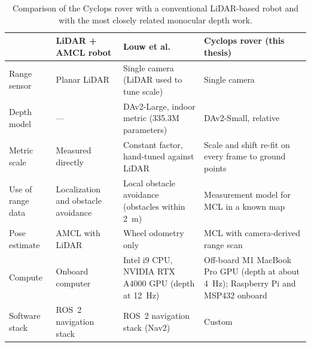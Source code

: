 \begin{table}[htbp]
  \centering
  \small
  \renewcommand{\arraystretch}{1.3}
  \caption[Comparison with related work]{Comparison of the Cyclops rover with a conventional
    LiDAR-based robot and with the most closely related monocular depth work.}
  \label{tab:rw-comparison}
  \begin{tabularx}{\textwidth}{>{\raggedright\arraybackslash}p{2.6cm}
      >{\raggedright\arraybackslash}X >{\raggedright\arraybackslash}X
      >{\raggedright\arraybackslash}X}
    \hline
    & \textbf{LiDAR + AMCL robot} & \textbf{Louw et al.~\cite{practical}} & \textbf{Cyclops rover (this thesis)} \\
    \hline
    Range sensor       & Planar LiDAR                & Single camera (LiDAR used to tune scale) & Single camera \\
    \hline
    Depth model        & ---                         & DAv2-Large, indoor metric (335.3M parameters) & DAv2-Small, relative \\
    \hline
    Metric scale       & Measured directly           & Constant factor, hand-tuned against LiDAR & Scale and shift re-fit on every frame to ground points \\
    \hline
    Use of range data  & Localization and obstacle avoidance & Local obstacle avoidance (obstacles within 2~m) & Measurement model for MCL in a known map \\
    \hline
    Pose estimate      & AMCL with LiDAR             & Wheel odometry only           & MCL with camera-derived range scan \\
    \hline
    Compute            & Onboard computer            & Intel i9 CPU, NVIDIA RTX A4000 GPU (depth at 12~Hz) & Off-board M1 MacBook Pro GPU (depth at about 4~Hz); Raspberry Pi and MSP432 onboard \\
    \hline
    Software stack     & ROS~2 navigation stack      & ROS~2 navigation stack (Nav2) & Custom \\
    \hline
  \end{tabularx}
\end{table}


